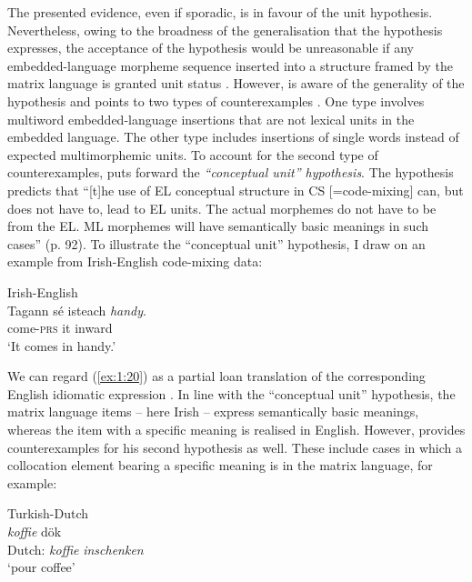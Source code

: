 The presented evidence, even if sporadic, is in favour of the unit hypothesis. Nevertheless, owing to the broadness of the generalisation that the hypothesis expresses, the acceptance of the hypothesis would be unreasonable if any embedded-language morpheme sequence inserted into a structure framed by the matrix language is granted unit status \citep[cf.][42]{wray-2002}. However, \citet[91]{backus-units-2003} is aware of the generality of the hypothesis and points to two types of counterexamples \citep[also see][105--107]{backus-evidence-1999}. One type involves multiword embedded-language insertions that are not lexical units in the embedded language. The other type includes insertions of single words instead of expected multimorphemic units. To account for the second type of counterexamples, \citet{backus-units-2003} puts forward the \textit{``conceptual unit'' hypothesis}. The hypothesis predicts that ``[t]he use of EL conceptual structure in CS [=code-mixing] can, but does not have to, lead to EL units. The actual morphemes do not have to be from the EL. ML morphemes will have semantically basic meanings in such cases'' (p. 92). To illustrate the ``conceptual unit'' hypothesis, I draw on an example from Irish-English code-mixing data:

\ea
\label{ex:1:20}
Irish-English \citep[184]{stenson-1990}\\
\gll Tagann sé isteach \textit{handy}.\\
come-{\textsc{prs}} it inward {}\\
\glt `It comes in handy.'
\z

\noindent We can regard (\ref{ex:1:20}) as a partial loan translation of the corresponding English idiomatic expression \citep[184]{stenson-1990}. In line with the ``conceptual unit'' hypothesis, the matrix language items -- here Irish -- express semantically basic meanings, whereas the item with a specific meaning is realised in English. However, \citeauthor[]{backus-units-2003} provides counterexamples for his second hypothesis as well. These include cases in which a collocation element bearing a specific meaning is in the matrix language, for example:

\ea{}\label{ex:1:21}
Turkish-Dutch \citep[111]{backus-units-2003}\\
\gll {} \textit{koffie} dök\\
Dutch: \textit{koffie} \textit{inschenken}\\
 \hspace{7.5mm} `pour coffee'
\z

